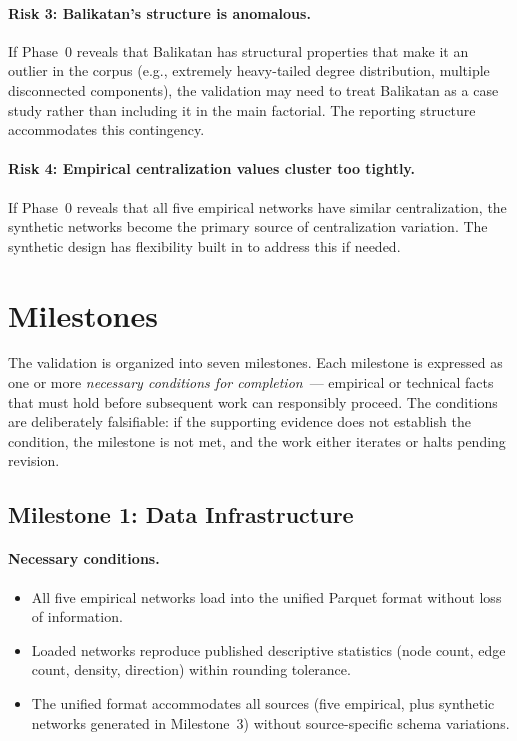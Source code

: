 \documentclass[11pt]{article}
\begin{document}
\paragraph{Risk 3: Balikatan's structure is anomalous.} If Phase~0 reveals that Balikatan has structural properties that make it an outlier in the corpus (e.g., extremely heavy-tailed degree distribution, multiple disconnected components), the validation may need to treat Balikatan as a case study rather than including it in the main factorial. The reporting structure accommodates this contingency.

\paragraph{Risk 4: Empirical centralization values cluster too tightly.} If Phase~0 reveals that all five empirical networks have similar centralization, the synthetic networks become the primary source of centralization variation. The synthetic design has flexibility built in to address this if needed.

\section{Milestones}

The validation is organized into seven milestones. Each milestone is expressed as one or more \emph{necessary conditions for completion}~--- empirical or technical facts that must hold before subsequent work can responsibly proceed. The conditions are deliberately falsifiable: if the supporting evidence does not establish the condition, the milestone is not met, and the work either iterates or halts pending revision.

\subsection*{Milestone 1: Data Infrastructure}

\paragraph{Necessary conditions.}
\begin{itemize}[leftmargin=*, itemsep=2pt]
  \item All five empirical networks load into the unified Parquet format without loss of information.
  \item Loaded networks reproduce published descriptive statistics (node count, edge count, density, direction) within rounding tolerance.
  \item The unified format accommodates all sources (five empirical, plus synthetic networks generated in Milestone~3) without source-specific schema variations.
\end{itemize}
\end{document}
